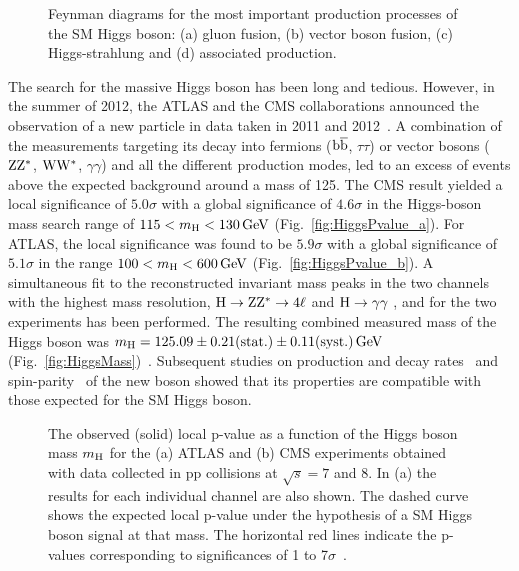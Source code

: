 \begin{figure}[!htb]
\centering
{}
\caption{Feynman diagrams for the most important production processes of the SM Higgs boson: (a) gluon fusion, (b) vector boson fusion, (c) Higgs-strahlung and (d) \ttbar associated production.}
\label{fig:HiggsProd}
\end{figure}

The search for the massive Higgs boson has been long and tedious. 
However, in the summer of 2012, the ATLAS and the CMS collaborations announced the observation of a new particle in data taken in 2011 and 2012~\cite{Aad:2012tfa,Chatrchyan:2013lba}.
A combination of the measurements targeting its decay into fermions (${\mathrm{b}\overline{\mathrm{b}}}$, $\tau\tau$) or vector bosons ($\mathrm{Z}\mathrm{Z}^*$, $\mathrm{W}\mathrm{W}^*$, $\gamma\gamma$) and all the different production modes, led to an excess of events above the expected background around a mass of 125\GeV.
The CMS result yielded a local significance of $5.0\sigma$ with a global significance of $4.6\sigma$ in the Higgs-boson mass search range of $115 < m_\mathrm{H} < 130\,\text{Ge\hspace{-.08em}V}$ (Fig.~\ref{fig:HiggsPvalue_a}).
For ATLAS, the local significance was found to be $5.9\sigma$ with a global significance of $5.1\sigma$ in the range $100 < m_\mathrm{H} < 600\,\text{Ge\hspace{-.08em}V}$ (Fig.~\ref{fig:HiggsPvalue_b}).
A simultaneous fit to the reconstructed invariant mass peaks in the two channels with the highest mass resolution, $\mathrm{H} \to \mathrm{Z}\mathrm{Z}^* \to 4\ell$ and $\mathrm{H} \to \gamma\gamma$ , and for the two experiments has been performed.
The resulting combined measured mass of the Higgs boson was $m_\mathrm{H} = 125.09 \pm 0.21 \mbox{(stat.)} \pm 0.11 \mbox{(syst.)} \,\text{Ge\hspace{-.08em}V}$ (Fig.~\ref{fig:HiggsMass})~\cite{Aad:2015zhl}.
Subsequent studies on production and decay rates~\cite{Khachatryan:2016vau} and spin-parity~\cite{Aad:2015mxa,Chatrchyan:2012jja,Khachatryan:2014kca} of the new boson showed that its properties are compatible with those expected for the SM Higgs boson. 

  \begin{figure}[!htb]
  \centering
  \caption{The observed (solid) local p-value as a function of the Higgs boson mass $m_\mathrm{H}$ for the (a) ATLAS and (b) CMS experiments obtained with data collected in pp collisions at $\sqrt{s} = 7$ and 8\TeV.
  In (a) the results for each individual channel are also shown. 
  The dashed curve shows the expected local p-value under the hypothesis of a SM Higgs boson signal at that mass.
  The horizontal red lines indicate the p-values corresponding to significances of 1 to 7$\sigma$~\cite{Aad:2012tfa,Chatrchyan:2013lba}.}
  \label{fig:HiggsPvalue}
\end{figure} 

